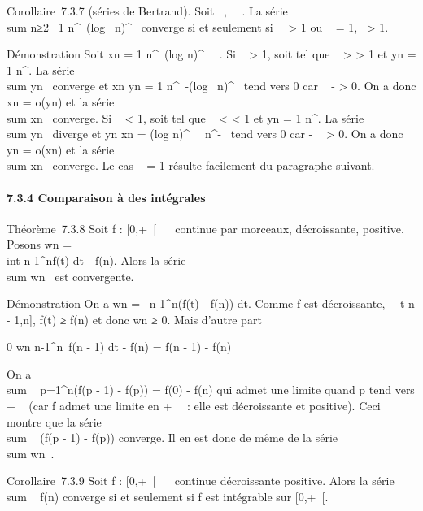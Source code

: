 Corollaire~7.3.7 (séries de Bertrand). Soit \alpha~,\beta~ \in {}~. La série
\\sum  n≥2~ 1
\over n^\alpha~(log~
n)^\beta~ converge si et seulement si~\alpha~ \textgreater{} 1 ou \alpha~ =
1,\beta~ \textgreater{} 1.

Démonstration Soit xn = 1 \over
n^\alpha~(log n)^\beta~~ . Si \alpha~
\textgreater{} 1, soit \gamma tel que \alpha~ \textgreater{} \gamma \textgreater{} 1 et
yn = 1 \over n^\gamma . La série
\\sum  yn~
converge et  xn \over yn = 1
\over n^\alpha~-\gamma(log~
n)^\beta~ tend vers 0 car \alpha~ - \gamma \textgreater{} 0. On a donc
xn = o(yn) et la série
\\sum  xn~
converge. Si \alpha~ \textless{} 1, soit \gamma tel que \alpha~ \textless{} \gamma \textless{}
1 et yn = 1 \over n^\gamma . La série
\\sum  yn~
diverge et  yn \over xn =
(log n)^\beta~~ \over
n^\gamma-\alpha~ tend vers 0 car \gamma - \alpha~ \textgreater{} 0. On a donc
yn = o(xn) et la série
\\sum  xn~
converge. Le cas \alpha~ = 1 résulte facilement du paragraphe suivant.

\paragraph{7.3.4 Comparaison à des intégrales}

Théorème~7.3.8 Soit f : {[}0,+\infty~{[}\rightarrow~ ~ continue par morceaux,
décroissante, positive. Posons wn =\\int
 n-1^nf(t) dt - f(n). Alors la série
\\sum  wn~ est
convergente.

Démonstration On a wn =\int ~
n-1^n(f(t) - f(n)) dt. Comme f est décroissante,
\forall~~t \in {[}n - 1,n{]}, f(t) ≥ f(n) et donc
wn ≥ 0. Mais d'autre part

0 \leq wn \leq\int  n-1^n~f(n
- 1) dt - f(n) = f(n - 1) - f(n)

On a \\sum ~
p=1^n(f(p - 1) - f(p)) = f(0) - f(n) qui admet une limite
quand p tend vers + \infty~ (car f admet une limite en + \infty~~: elle est
décroissante et positive). Ceci montre que la série
\\sum ~ (f(p - 1) - f(p))
converge. Il en est donc de même de la série
\\sum  wn~.

Corollaire~7.3.9 Soit f : {[}0,+\infty~{[}\rightarrow~ ~ continue décroissante positive.
Alors la série \\sum ~
f(n) converge si et seulement si f est intégrable sur {[}0,+\infty~{[}.

